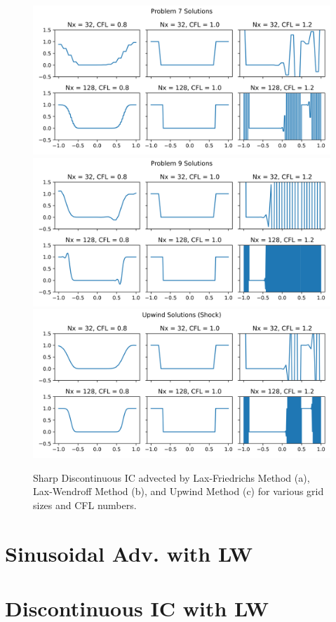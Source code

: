 \documentclass{article}
\begin{document}
\begin{figure}[t]
    \centering
    \includegraphics[width=.6\textwidth]{../code/prob7_tstop.png}
    \includegraphics[width=.6\textwidth]{../code/prob9_tstop.png}
    \includegraphics[width=.6\textwidth]{../code/upwind_shock_tstop.png}
    \caption{Sharp Discontinuous IC advected by Lax-Friedrichs Method (a),
    Lax-Wendroff Method (b), and Upwind Method (c) for various grid sizes and
    CFL numbers.}
    \label{fig:discont_ic}
\end{figure}

\section{Sinusoidal Adv. with LW}

\section{Discontinuous IC with LW}
\end{document}
